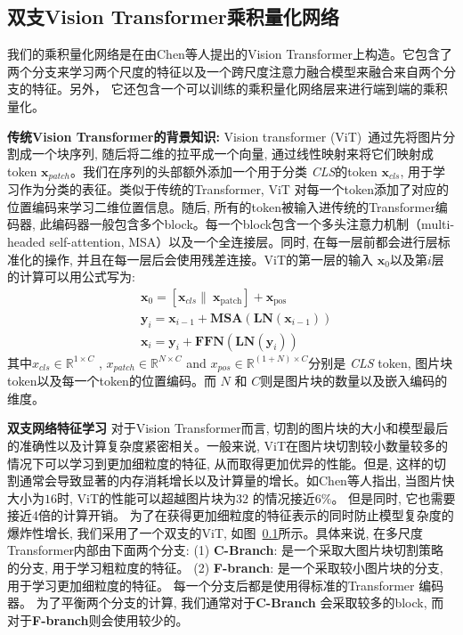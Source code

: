 \subsection{双支Vision Transformer乘积量化网络}
我们的乘积量化网络是在由Chen等人提出\cite{chen2021crossvit}的Vision Transformer上构造。它包含了两个分支来学习两个尺度的特征以及一个跨尺度注意力融合模型来融合来自两个分支的特征。另外， 它还包含一个可以训练的乘积量化网络层来进行端到端的乘积量化。 \par
\textbf{传统Vision Transformer的背景知识:} Vision transformer (ViT)~\cite{dosovitskiy2020image}通过先将图片分割成一个块序列, 随后将二维的拉平成一个向量, 通过线性映射来将它们映射成token $\mathbf{x}_{patch}$。我们在序列的头部额外添加一个用于分类 \textit{CLS}的token $\mathbf{x}_{cls}$, 用于学习作为分类的表征。类似于传统的Transformer, ViT 对每一个token添加了对应的位置编码来学习二维位置信息。随后, 所有的token被输入进传统的Transformer编码器, 此编码器一般包含多个block。每一个block包含一个多头注意力机制（multi-headed self-attention, MSA）以及一个全连接层。同时, 在每一层前都会进行层标准化的操作, 并且在每一层后会使用残差连接。ViT的第一层的输入 $\mathbf{x}_0$以及第$i$层的计算可以用公式写为:
\begin{equation}
    \begin{aligned}
    &\mathbf{x}_{0}=\left[\mathbf{x}_{cls} \| \ \mathbf{x}_{\text{patch}}\right]+\mathbf{x}_{\text {pos }} \\
    &\mathbf{y}_{i}=\mathbf{x}_{i-1}+\mathbf{MSA}\left(\mathbf{LN}\left(\mathbf{x}_{i-1}\right)\right) \\
    &\mathbf{x}_{i}=\mathbf{y}_{i}+\mathbf{FFN}\left(\mathbf{LN}\left(\mathbf{y}_{i}\right)\right)
\end{aligned}
\end{equation}
其中$x_{cls} \in \mathbb{R}^{1\times C}$ , $x_{patch} \in \mathbb{R}^{N\times C}$ and $x_{pos} \in \mathbb{R}^{(1+N) \times C}$分别是 \textit{CLS} token, 图片块 token以及每一个token的位置编码。而 $N$ 和 $C$则是图片块的数量以及嵌入编码的维度。 \par
\textbf{双支网络特征学习}
对于Vision Transformer而言, 切割的图片块的大小和模型最后的准确性以及计算复杂度紧密相关。一般来说, ViT在图片块切割较小数量较多的情况下可以学习到更加细粒度的特征, 从而取得更加优异的性能。但是, 这样的切割通常会导致显著的内存消耗增长以及计算量的增长。如Chen等人\cite{chen2021crossvit}指出, 当图片快大小为$16$时, ViT的性能可以超越图片块为$32$ 的情况接近$6\%$。 但是同时, 它也需要接近4倍的计算开销。 为了在获得更加细粒度的特征表示的同时防止模型复杂度的爆炸性增长, 我们采用了一个双支的ViT, 如图~\ref{}所示。具体来说, 在多尺度Transformer内部由下面两个分支: (1)  \textbf{C-Branch}: 是一个采取大图片块切割策略的分支, 用于学习粗粒度的特征。 (2) \textbf{F-branch}: 是一个采取较小图片块的分支, 用于学习更加细粒度的特征。 每一个分支后都是使用得标准的Transformer 编码器。 为了平衡两个分支的计算, 我们通常对于\textbf{C-Branch} 会采取较多的block, 而对于\textbf{F-branch}则会使用较少的。\par
